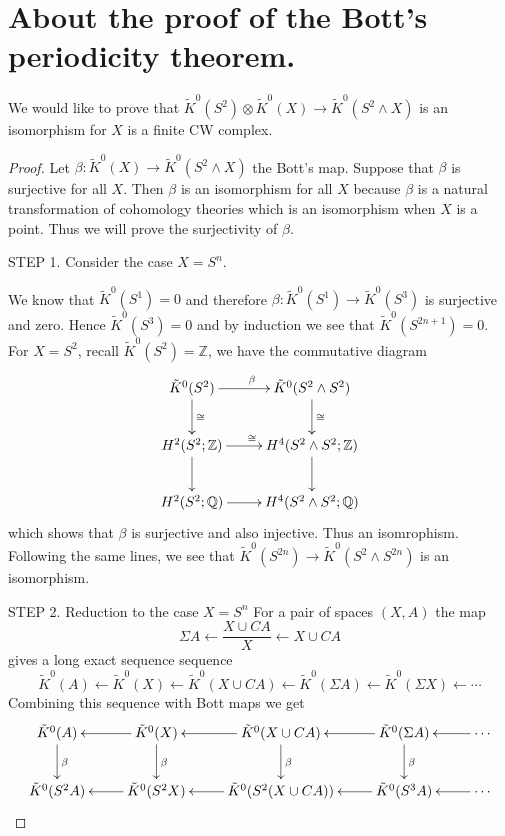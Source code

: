 \documentclass[a4paper,10pt]{article}
\theoremstyle{plain}%
\theoremstyle{definition}
\theoremstyle{remark}
\newcommand{\ZZ}{\mathbb{Z}}
\newcommand{\QQ}{\mathbb{Q}}
\begin{document}
\section{About the proof of the Bott's periodicity theorem.}
We would like to prove that $\tilde{K}^0(S^2)\otimes \tilde{K}^0(X)\to \tilde{K}^0(S^2\wedge X)$  is an isomorphism for $X$ is a finite CW complex.
\begin{proof}
Let $\beta:\tilde{K}^0(X)\to \tilde{K}^0(S^2\wedge X)$ the Bott's map. Suppose that $\beta$ is surjective for all $X$. Then $\beta$ is an isomorphism for all $X$ because $\beta$ is a natural transformation of cohomology theories which is an isomorphism when $X$ is a point. Thus we will prove the surjectivity of $\beta$.

STEP 1. Consider the case $X =  S^n.$

We know that $\tilde{K}^0(S^1) = 0$ and therefore $\beta:\tilde{K}^0(S^1)\to \tilde{K}^0(S^3)$ is surjective and zero. Hence $\tilde{K}^0(S^3) = 0$ and by induction we see that $\tilde{K}^0(S^{2n+1}) = 0$.
For $X= S^2$, recall $\tilde{K}^0(S^2) = \ZZ$, we have the commutative diagram
\begin{displaymath}
    \xymatrix{
        \tilde{K}^0(S^2) \ar[r]^\beta \ar[d]^{\cong} & \tilde{K}^0(S^2\wedge S^2) \ar[d]^{\cong} \\
        H^2(S^2;\ZZ) \ar[r]^{\cong} \ar[d]      & H^4(S^2\wedge S^2;\ZZ) \ar[d] \\
		H^2(S^2;\QQ) \ar[r]    & H^4(S^2\wedge S^2;\QQ)
        }
\end{displaymath}
which shows that $\beta$ is surjective and also injective. Thus an isomrophism. Following the same lines, we see that $\tilde{K}^0(S^{2n})\to \tilde{K}^0(S^2\wedge S^{2n})$ is an isomorphism.

STEP 2. Reduction to the case $X = S^n$
For a pair of spaces $(X,A)$ the map
\[
\Sigma A \leftarrow \frac{X\cup CA}{X} \leftarrow X\cup CA 
\] gives a long exact sequence sequence
\[
\tilde{K}^0(A) \leftarrow \tilde{K}^0(X) \leftarrow \tilde{K}^0(X\cup CA) \leftarrow \tilde{K}^0(\Sigma A) \leftarrow \tilde{K}^0(\Sigma X) \leftarrow \cdots
\]
Combining this sequence with Bott maps we get
\begin{displaymath}
    \xymatrix{
        \tilde{K}^0(A) \ar[d]^{\beta} & \tilde{K}^0(X) \ar[l] \ar[d]^{\beta} & \tilde{K}^0(X\cup CA) \ar[l] \ar[d]^{\beta} & \tilde{K}^0(\Sigma A) \ar[l] \ar[d]^{\beta} &\ar[l]\cdots\\
        \tilde{K}^0(S^2A)  & \tilde{K}^0(S^2X) \ar[l]& \tilde{K}^0(S^2(X\cup CA)) \ar[l] & \tilde{K}^0(S^3 A) \ar[l] &\ar[l]\cdots
        }
\end{displaymath}


\end{proof}
\end{document}
